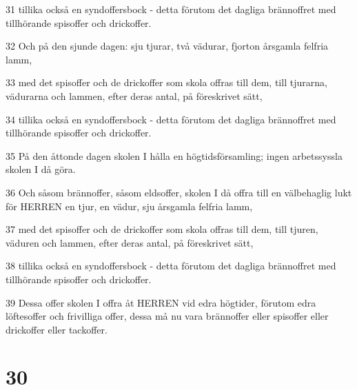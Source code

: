 \par 31 tillika också en syndoffersbock - detta förutom det dagliga brännoffret med tillhörande spisoffer och drickoffer.
\par 32 Och på den sjunde dagen: sju tjurar, två vädurar, fjorton årsgamla felfria lamm,
\par 33 med det spisoffer och de drickoffer som skola offras till dem, till tjurarna, vädurarna och lammen, efter deras antal, på föreskrivet sätt,
\par 34 tillika också en syndoffersbock - detta förutom det dagliga brännoffret med tillhörande spisoffer och drickoffer.
\par 35 På den åttonde dagen skolen I hålla en högtidsförsamling; ingen arbetssyssla skolen I då göra.
\par 36 Och såsom brännoffer, såsom eldsoffer, skolen I då offra till en välbehaglig lukt för HERREN en tjur, en vädur, sju årsgamla felfria lamm,
\par 37 med det spisoffer och de drickoffer som skola offras till dem, till tjuren, väduren och lammen, efter deras antal, på föreskrivet sätt,
\par 38 tillika också en syndoffersbock - detta förutom det dagliga brännoffret med tillhörande spisoffer och drickoffer.
\par 39 Dessa offer skolen I offra åt HERREN vid edra högtider, förutom edra löftesoffer och frivilliga offer, dessa må nu vara brännoffer eller spisoffer eller drickoffer eller tackoffer.

\chapter{30}

